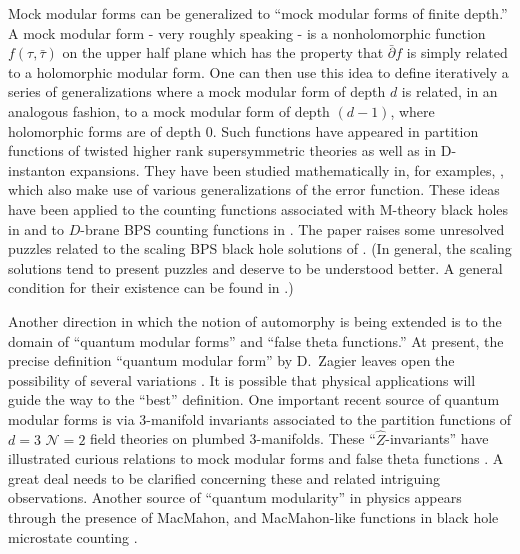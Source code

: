 \documentclass[12pt]{article}
\newcommand\CalN{\mathcal{N}}
\begin{document}
Mock modular forms can be generalized to ``mock modular forms of finite depth.'' 
A mock modular form - very roughly speaking - is a nonholomorphic function 
$f(\tau, \bar \tau)$  on the upper half plane which has the property that 
$\bar\partial f$ is simply related to a holomorphic modular form. One can 
then use this idea to define iteratively a series of generalizations where 
a mock modular form of depth $d$ is related, in an analogous fashion, to  
a mock modular form of depth $(d-1)$, where holomorphic forms are of depth $0$. 
Such functions have appeared in 
partition functions of twisted higher rank supersymmetric theories as well as in 
D-instanton expansions. They have been studied mathematically in, for examples, 
\cite{Alexandrov:2016enp,Funke-Kudla,Nazaroglu:2016lmr}, which also make use of 
various generalizations of the error function. These ideas have been 
applied to the counting functions associated with M-theory black holes in 
\cite{Alexandrov:2018lgp} and to $D$-brane BPS counting functions in 
\cite{Chattopadhyaya:2021rdi}. The paper \cite{Chattopadhyaya:2021rdi}
raises some unresolved puzzles related to the scaling BPS black hole solutions 
of \cite{Denef:2007vg}. (In general, the scaling solutions tend to present 
puzzles \cite{Denef:2007vg,Bena:2012hf,Manschot:2013sya,Manschot:2014fua} and deserve to be understood 
better. A general condition for their existence can be found in \cite{Descombes:2021egc}.)  




Another direction in which the notion of automorphy is 
being extended is to the domain of ``quantum modular forms'' and 
``false theta functions.''  At present, the precise definition  ``quantum modular 
form'' by D.~Zagier leaves open the possibility of several variations 
\cite{Lawrence-Zagier,Zagier-QMF}.
It is possible that physical applications will guide the way to the ``best'' definition. One important recent source of quantum modular forms is via $3$-manifold invariants associated to the partition functions of $d=3$ ${\CalN}=2$ field theories
on plumbed 3-manifolds. These ``$\hat Z$-invariants'' have illustrated 
curious relations to mock modular forms and false theta functions 
\cite{Bringmann:2018ddv,Cheng:2018vpl,Cheng:2019uzc}. A great deal needs to be clarified concerning these and related intriguing observations. Another source of ``quantum modularity'' in physics appears through 
the presence of MacMahon, and MacMahon-like functions in black hole 
microstate counting \cite{Dabholkar:2005dt,Jafferis:2008uf,Mozgovoy:2020has,Okounkov:2003sp}.
\end{document}

